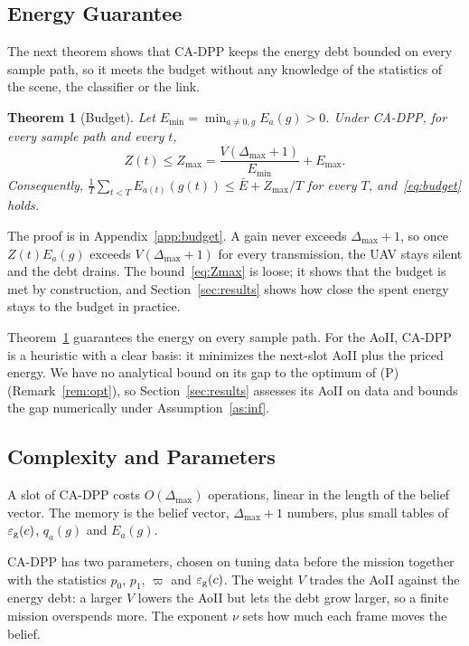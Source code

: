 \documentclass[5p,twocolumn]{elsarticle}
\newtheorem{theorem}{Theorem}
\theoremstyle{remark}
\newcommand{\ee}{\varepsilon}
\begin{document}
\subsection{Energy Guarantee}
The next theorem shows that CA-DPP keeps the energy debt bounded on every sample path, so it meets the budget without any knowledge of the statistics of the scene, the classifier or the link.

\begin{theorem}[Budget]\label{thm:budget}
Let $E_{\min}=\min_{a\neq0,g}E_a(g)>0$. Under CA-DPP, for every sample path and every $t$,
\begin{equation}\label{eq:Zmax}
Z(t)\le Z_{\max}=\frac{V(\Delta_{\max}+1)}{E_{\min}}+E_{\max}.
\end{equation}
Consequently, $\frac1T\sum_{t<T}E_{a(t)}(g(t))\le\bar E+Z_{\max}/T$ for every $T$, and~\eqref{eq:budget} holds.
\end{theorem}

The proof is in Appendix~\ref{app:budget}. A gain never exceeds $\Delta_{\max}+1$, so once $Z(t)E_a(g)$ exceeds $V(\Delta_{\max}+1)$ for every transmission, the UAV stays silent and the debt drains. The bound~\eqref{eq:Zmax} is loose; it shows that the budget is met by construction, and Section~\ref{sec:results} shows how close the spent energy stays to the budget in practice.

Theorem~\ref{thm:budget} guarantees the energy on every sample path. For the AoII, CA-DPP is a heuristic with a clear basis: it minimizes the next-slot AoII plus the priced energy. We have no analytical bound on its gap to the optimum of (P) (Remark~\ref{rem:opt}), so Section~\ref{sec:results} assesses its AoII on data and bounds the gap numerically under Assumption~\ref{as:inf}.

\subsection{Complexity and Parameters}
A slot of CA-DPP costs $O(\Delta_{\max})$ operations, linear in the length of the belief vector. The memory is the belief vector, $\Delta_{\max}+1$ numbers, plus small tables of $\ee_{\rm g}(c)$, $q_a(g)$ and $E_a(g)$.

CA-DPP has two parameters, chosen on tuning data before the mission together with the statistics $p_0$, $p_1$, $\varpi$ and $\ee_{\rm g}(c)$. The weight $V$ trades the AoII against the energy debt: a larger $V$ lowers the AoII but lets the debt grow larger, so a finite mission overspends more. The exponent $\nu$ sets how much each frame moves the belief.
\end{document}
